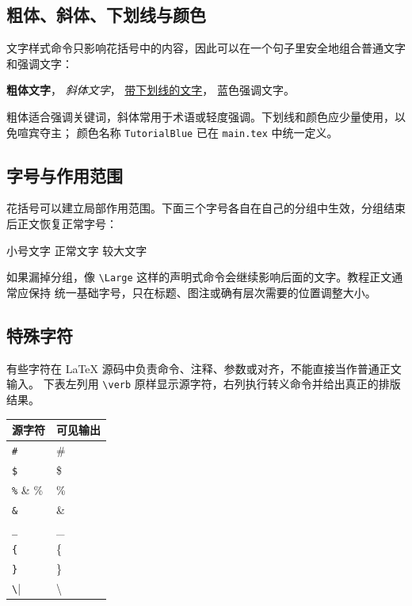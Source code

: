 \subsection{粗体、斜体、下划线与颜色}

文字样式命令只影响花括号中的内容，因此可以在一个句子里安全地组合普通文字和强调文字：

\textbf{粗体文字}，
\textit{斜体文字}，
\underline{带下划线的文字}，
\textcolor{TutorialBlue}{蓝色强调文字}。

粗体适合强调关键词，斜体常用于术语或轻度强调。下划线和颜色应少量使用，以免喧宾夺主；
颜色名称 \texttt{TutorialBlue} 已在 \texttt{main.tex} 中统一定义。

\subsection{字号与作用范围}

花括号可以建立局部作用范围。下面三个字号各自在自己的分组中生效，分组结束后正文恢复正常字号：

{\small 小号文字}\quad
{\normalsize 正常文字}\quad
{\Large 较大文字}

如果漏掉分组，像 \verb|\Large| 这样的声明式命令会继续影响后面的文字。教程正文通常应保持
统一基础字号，只在标题、图注或确有层次需要的位置调整大小。

\subsection{特殊字符}

有些字符在 LaTeX 源码中负责命令、注释、参数或对齐，不能直接当作普通正文输入。
下表左列用 \verb|\verb| 原样显示源字符，右列执行转义命令并给出真正的排版结果。

\begin{center}
\begin{tabular}{ll}
\toprule
源字符 & 可见输出 \\
\midrule
\verb|#|  & \# \\
\verb|$|  & \$ \\
\verb|%|  & \% \\
\verb|&|  & \& \\
\verb|_|  & \_ \\
\verb|{|  & \{ \\
\verb|}|  & \} \\
\verb|\|  & \textbackslash{} \\
\bottomrule
\end{tabular}
\end{center}

